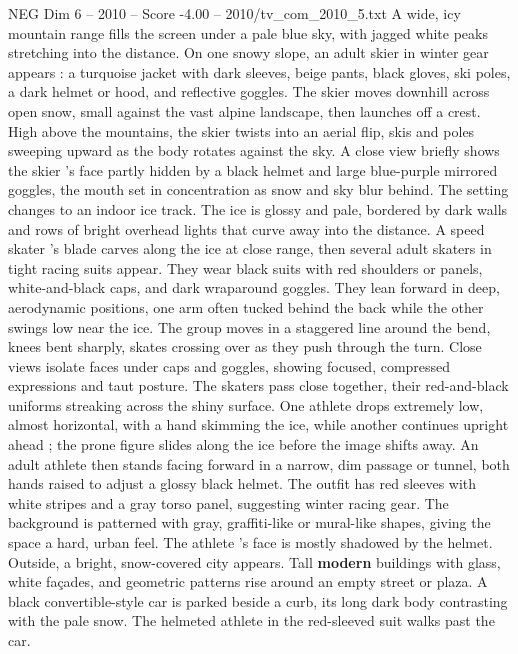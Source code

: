 \begin{textsample}{NEG Dim 6 – 2010 – Score -4.00 – 2010/tv\_com\_2010\_5.txt}  \label{ex:f6_neg_002}
A wide, icy mountain range fills the screen under a pale blue sky, with jagged white peaks stretching into the distance.
On one snowy slope, an adult skier in winter gear appears : a turquoise jacket with dark sleeves, beige pants, black gloves, ski poles, a dark helmet or hood, and reflective goggles.
The skier moves downhill across open snow, small against the vast alpine landscape, then launches off a crest.
High above the mountains, the skier twists into an aerial flip, skis and poles sweeping upward as the body rotates against the sky.
A close view briefly shows the skier ’s face partly hidden by a black helmet and large blue-purple mirrored goggles, the mouth set in concentration as snow and sky blur behind.
The setting changes to an indoor ice track.
The ice is glossy and pale, bordered by dark walls and rows of bright overhead lights that curve away into the distance.
A speed skater ’s blade carves along the ice at close range, then several adult skaters in tight racing suits appear.
They wear black suits with red shoulders or panels, white-and-black caps, and dark wraparound goggles.
They lean forward in deep, aerodynamic positions, one arm often tucked behind the back while the other swings low near the ice.
The group moves in a staggered line around the bend, knees bent sharply, skates crossing over as they push through the turn.
Close views isolate faces under caps and goggles, showing focused, compressed expressions and taut posture.
The skaters pass close together, their red-and-black uniforms streaking across the shiny surface.
One athlete drops extremely low, almost horizontal, with a hand skimming the ice, while another continues upright ahead ; the prone figure slides along the ice before the image shifts away.
An adult athlete then stands facing forward in a narrow, dim passage or tunnel, both hands raised to adjust a glossy black helmet.
The outfit has red sleeves with white stripes and a gray torso panel, suggesting winter racing gear.
The background is patterned with gray, graffiti-like or mural-like shapes, giving the space a hard, urban feel.
The athlete ’s face is mostly shadowed by the helmet.
Outside, a bright, snow-covered city appears.
Tall \textbf{modern} buildings with glass, white façades, and geometric patterns rise around an empty street or plaza.
A black convertible-style car is parked beside a curb, its long dark body contrasting with the pale snow.
The helmeted athlete in the red-sleeved suit walks past the car.

\end{textsample}
